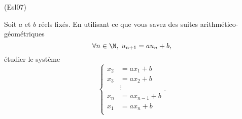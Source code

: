 \begin{tiny}(Esl07)\end{tiny} Soit $a$ et $b$ réels fixés. En utilisant ce que vous savez des suites arithmético-géométriques
\[
  \forall n \in \N,\; u_{n+1} = au_n + b,
\]
étudier le système
\[
\left\lbrace 
\begin{aligned}
  x_2 &= a x_1 + b \\
  x_3 &= a x_2 + b \\
      &\vdots \\
  x_n &= a x_{n-1} + b \\
  x_1 &= a x_n + b \\
\end{aligned}
\right. .
\]

